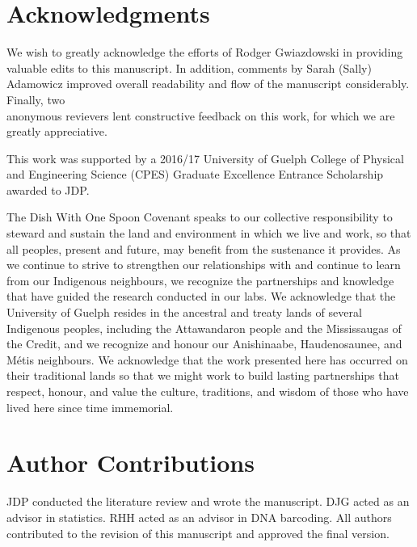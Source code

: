 \newpage

\section*{Acknowledgments}

We wish to greatly acknowledge the efforts of Rodger Gwiazdowski in providing \\ valuable edits to this manuscript. In addition, comments by Sarah (Sally) Adamowicz improved overall readability and flow of the manuscript considerably. Finally, two \\ anonymous revievers lent constructive feedback on this work, for which we are greatly appreciative.



This work was supported by a 2016/17 University of Guelph College of Physical and Engineering Science (CPES) Graduate Excellence Entrance Scholarship awarded to JDP.



The Dish With One Spoon Covenant speaks to our collective responsibility to steward and sustain the land and environment in which we live and work, so that all peoples, present and future, may benefit from the sustenance it provides. As we continue to strive to strengthen our relationships with and continue to learn from our Indigenous neighbours, we recognize the partnerships and knowledge that have guided the research conducted in our labs. We acknowledge that the University of Guelph resides in the ancestral and treaty lands of several Indigenous peoples, including the Attawandaron people and the Mississaugas of the Credit, and we recognize and honour our Anishinaabe, Haudenosaunee, and M{\'e}tis neighbours. We acknowledge that the work presented here has occurred on their traditional lands so that we might work to build lasting partnerships that respect, honour, and value the culture, traditions, and wisdom of those who have lived here since time immemorial.



\section*{Author Contributions}

JDP conducted the literature review and wrote the manuscript. DJG acted as an advisor in statistics. RHH acted as an advisor in DNA barcoding. All authors contributed to the revision of this manuscript and approved the final version. 



